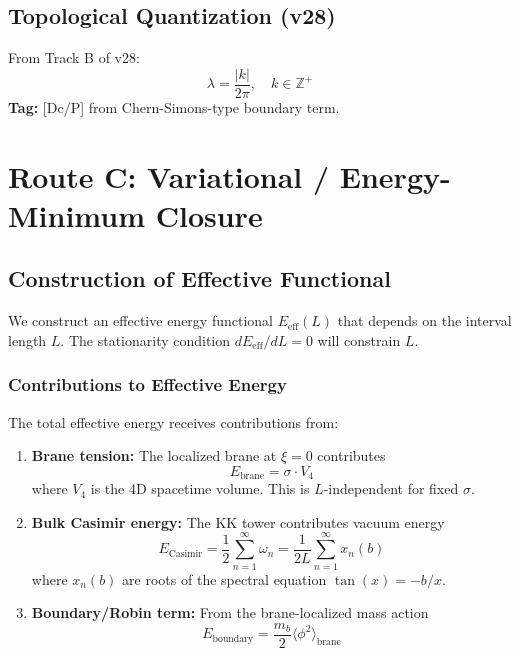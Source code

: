 \documentclass[11pt,a4paper]{article}
\begin{document}
\subsection{Topological Quantization (v28)}

From Track B of v28:
\begin{equation}
  \boxed{\lambda = \frac{|k|}{2\pi}, \quad k \in \mathbb{Z}^+}
  \label{eq:lambda-quant}
\end{equation}
\textbf{Tag:} [Dc/P] from Chern-Simons-type boundary term.

\section{Route C: Variational / Energy-Minimum Closure}
\label{sec:route-c}

\subsection{Construction of Effective Functional}

We construct an effective energy functional $E_{\text{eff}}(L)$ that depends on
the interval length $L$. The stationarity condition $dE_{\text{eff}}/dL = 0$
will constrain $L$.

\subsubsection{Contributions to Effective Energy}

The total effective energy receives contributions from:

\begin{enumerate}
\item \textbf{Brane tension:} The localized brane at $\xi = 0$ contributes
\begin{equation}
  E_{\text{brane}} = \sigma \cdot V_4
  \label{eq:E-brane}
\end{equation}
where $V_4$ is the 4D spacetime volume. This is $L$-independent for fixed $\sigma$.

\item \textbf{Bulk Casimir energy:} The KK tower contributes vacuum energy
\begin{equation}
  E_{\text{Casimir}} = \frac{1}{2} \sum_{n=1}^{\infty} \omega_n
                     = \frac{1}{2L} \sum_{n=1}^{\infty} x_n(b)
  \label{eq:E-casimir-raw}
\end{equation}
where $x_n(b)$ are roots of the spectral equation $\tan(x) = -b/x$.

\item \textbf{Boundary/Robin term:} From the brane-localized mass action
\begin{equation}
  E_{\text{boundary}} = \frac{m_b}{2} \langle \phi^2 \rangle_{\text{brane}}
  \label{eq:E-boundary}
\end{equation}
\end{enumerate}
\end{document}
